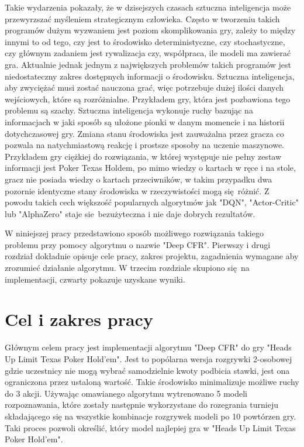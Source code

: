 \documentclass[12pt,oneside,a4paper]{report}
\begin{document}
Takie wydarzenia pokazały, że w dzisejszych czasach sztuczna inteligencja może przewyrzszać
myśleniem strategicznym człowieka.
Często w tworzeniu takich programów dużym wyzwaniem jest poziom skomplikowania gry, 
zależy to między innymi to od tego, czy jest to środowisko deterministyczne, czy stochastyczne, 
czy głównym zadaniem jest rywalizacja czy, współpraca, ile modeli ma zawierać gra.
Aktualnie jednak jednym z największych problemów takich programów jest niedostateczny
zakres dostępnych informacji o środowisku. Sztuczna inteligencja, aby zwyciężać
musi zostać nauczona grać, więc potrzebuje dużej ilości danych wejściowych, które są 
rozróżnialne. Przykładem gry, która jest pozbawiona tego problemu są szachy. 
Sztuczna inteligencja wykonuje ruchy bazując na informacjach w jaki sposób są ułożone pionki
w danym momencie i na historii dotychczasowej gry. Zmiana stanu środowiska jest
zauważalna przez gracza co pozwala na natychmiastową reakcję i prostsze sposoby na uczenie
maszynowe. Przykładem gry ciężkiej do rozwiązania, w której występuje nie pełny zestaw informacji 
jest Poker Texas Holdem, po mimo wiedzy o kartach w ręce i na stole, gracz nie posiada wiedzy o 
kartach przeciwników, w takim przypadku dwa pozornie identyczne stany środowiska w
rzeczywistości mogą się różnić. Z powodu takich cech większość popularnych algorytmów jak 
"DQN", "Actor-Critic" lub "AlphaZero" staje sie bezużyteczna i nie daje dobrych rezultatów.

W niniejszej pracy przedstawiono sposób możliwego rozwiązania takiego problemu przy pomocy 
algorytmu o nazwie "Deep CFR". Pierwszy i drugi rozdział dokładnie opisuje cele pracy, zakres projektu, 
zagadnienia wymagane aby zrozumieć działanie algorytmu. W trzecim rozdziale skupiono się na
implementacji, czwarty pokazuje uzyskane wyniki.


\section{Cel i zakres pracy}

Głównym celem pracy jest implementacji algorytmu "Deep CFR" do gry "Heads Up Limit Texas 
Poker Hold'em". Jest to popólarna wersja rozgrywki 2-osobowej gdzie uczestnicy nie mogą wybrać
samodzielnie kwoty podbicia stawki, jest ona ograniczona przez ustaloną wartość. Takie środowisko
minimalizuje możliwe ruchy do 3 akcji. Używając omawianego algorytmu
wytrenowano 5 modeli rozpoznawania, które zostały następnie wykorzystane do rozegrania
turnieju składającego się na wszystkie kombinacje rozgrywek modeli po
10 powtórzen gry. Taki proces pozwoli określić, który model najlepiej gra w 
"Heads Up Limit Texas Poker Hold'em". 
\end{document}
